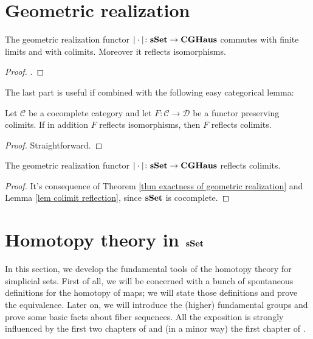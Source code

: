 \section{Geometric realization}

\begin{thm} \label{thm exactness of geometric realization}
The geometric realization functor $| \cdot | \colon \mathbf{sSet} \to \mathbf{CGHaus}$ commutes with finite limits and with colimits. Moreover it reflects isomorphisms.
\end{thm}

\begin{proof}
\cite[Ch. III.3]{gz}.
\end{proof}

The last part is useful if combined with the following easy categorical lemma:

\begin{lemma} \label{lem colimit reflection}
Let $\mathcal C$ be a cocomplete category and let $F \colon \mathcal C \to \mathcal D$ be a functor preserving colimits. If in addition $F$ reflects isomorphisms, then $F$ reflects colimits.
\end{lemma}

\begin{proof}
Straightforward.
\end{proof}

\begin{cor} \label{cor colimit in sset}
The geometric realization functor $| \cdot | \colon \mathbf{sSet} \to \mathbf{CGHaus}$ reflects colimits.
\end{cor}

\begin{proof}
It's consequence of Theorem \ref{thm exactness of geometric realization} and Lemma \ref{lem colimit reflection}, since $\mathbf{sSet}$ is cocomplete.
\end{proof}

\section{Homotopy theory in $\mathbf{sSet}$}

In this section, we develop the fundamental tools of the homotopy theory for simplicial sets. First of all, we will be concerned with a bunch of spontaneous definitions for the homotopy of maps; we will state those definitions and prove the equivalence. Later on, we will introduce the (higher) fundamental groups and prove some basic facts about fiber sequences. All the exposition is strongly influenced by the first two chapters of \cite{may} and (in a minor way) the first chapter of \cite{gj}.



